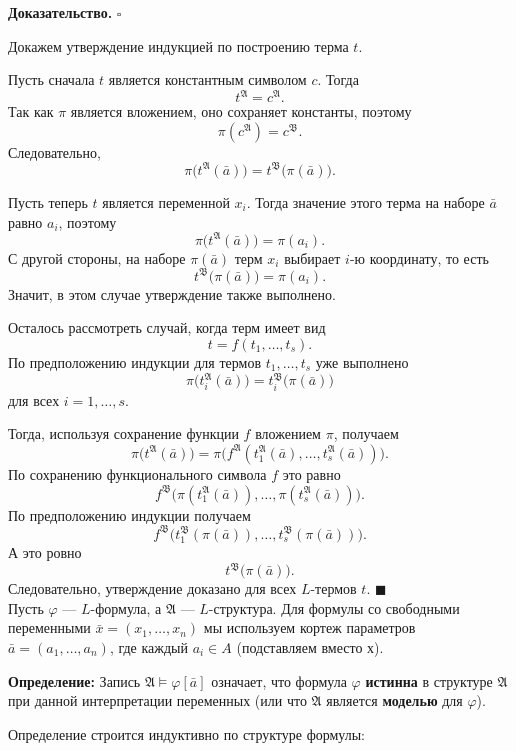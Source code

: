 \documentclass[12pt,a4paper,oneside,openany]{book}
\theoremstyle{definition}
\theoremstyle{plain}
\theoremstyle{remark}
\begin{document}
\textbf{Доказательство.}
$\square$

Докажем утверждение индукцией по построению терма $t$.

Пусть сначала $t$ является константным символом $c$. Тогда
\[
t^{\mathfrak A}=c^{\mathfrak A}.
\]
Так как $\pi$ является вложением, оно сохраняет константы, поэтому
\[
\pi(c^{\mathfrak A})=c^{\mathfrak B}.
\]
Следовательно,
\[
\pi\bigl(t^{\mathfrak A}(\bar a)\bigr)
=
t^{\mathfrak B}\bigl(\pi(\bar a)\bigr).
\]

Пусть теперь $t$ является переменной $x_i$. Тогда значение этого терма на наборе $\bar a$ равно $a_i$, поэтому
\[
\pi\bigl(t^{\mathfrak A}(\bar a)\bigr)=\pi(a_i).
\]
С другой стороны, на наборе $\pi(\bar a)$ терм $x_i$ выбирает $i$-ю координату, то есть
\[
t^{\mathfrak B}\bigl(\pi(\bar a)\bigr)=\pi(a_i).
\]
Значит, в этом случае утверждение также выполнено.

Осталось рассмотреть случай, когда терм имеет вид
\[
t=f(t_1,\ldots,t_s).
\]
По предположению индукции для термов $t_1,\ldots,t_s$ уже выполнено
\[
\pi\bigl(t_i^{\mathfrak A}(\bar a)\bigr)
=
t_i^{\mathfrak B}\bigl(\pi(\bar a)\bigr)
\]
для всех $i=1,\ldots,s$.

Тогда, используя сохранение функции $f$ вложением $\pi$, получаем
\[
\pi\bigl(t^{\mathfrak A}(\bar a)\bigr)
=
\pi\bigl(f^{\mathfrak A}(t_1^{\mathfrak A}(\bar a),\ldots,t_s^{\mathfrak A}(\bar a))\bigr).
\]
По сохранению функционального символа $f$ это равно
\[
f^{\mathfrak B}\bigl(
\pi(t_1^{\mathfrak A}(\bar a)),\ldots,
\pi(t_s^{\mathfrak A}(\bar a))
\bigr).
\]
По предположению индукции получаем
\[
f^{\mathfrak B}\bigl(
t_1^{\mathfrak B}(\pi(\bar a)),\ldots,
t_s^{\mathfrak B}(\pi(\bar a))
\bigr).
\]
А это ровно
\[
t^{\mathfrak B}\bigl(\pi(\bar a)\bigr).
\]
Следовательно, утверждение доказано для всех $L$-термов $t$.
$\blacksquare$ \vspace{5mm}
 \\
Пусть $\varphi$ — $L$-формула, а $\mathfrak{A}$ — $L$-структура. 
Для формулы со свободными переменными $\bar{x} = (x_1, \dots, x_n)$ мы используем кортеж параметров $\bar{a} = (a_1, \dots, a_n)$, где каждый $a_i \in A$ (подставляем вместо х).

\textbf{Определение:} Запись $\mathfrak{A} \models \varphi[\bar{a}]$ означает, что формула $\varphi$ \textbf{истинна} в структуре $\mathfrak{A}$ при данной интерпретации переменных (или что $\mathfrak{A}$ является \textbf{моделью} для $\varphi$).

Определение строится индуктивно по структуре формулы:
\end{document}

